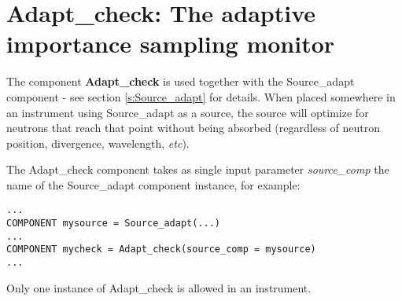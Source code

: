 \section{Adapt\_check: The adaptive importance sampling monitor}
\label{s:adapt_check}


The component {\bf Adapt\_check} is used together with the Source\_adapt component - see section \ref{s:Source_adapt} for details. When placed somewhere in an instrument using Source\_adapt as a source, the source will optimize for neutrons that reach that point without being absorbed (regardless of neutron position, divergence, wavelength, \emph{etc}).

The Adapt\_check component takes as single input parameter \emph{source\_comp} the name of the Source\_adapt component instance, for example:

\begin{verbatim}
...
COMPONENT mysource = Source_adapt(...)
...
COMPONENT mycheck = Adapt_check(source_comp = mysource)
...
\end{verbatim}

Only one instance of Adapt\_check is allowed in an instrument.